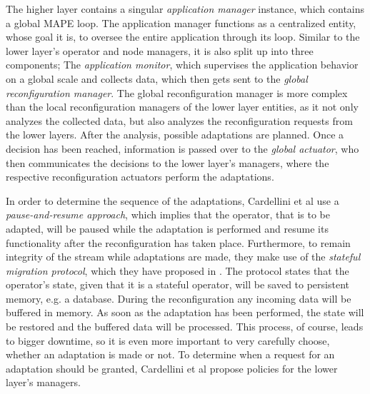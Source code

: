         \quad The higher layer contains a singular \textit{application manager} instance, which contains a global MAPE loop.
        The application manager functions as a centralized entity, whose goal it is, to oversee the entire application through its loop.
        Similar to the lower layer's operator and node managers, it is also split up into three components;
        The \textit{application monitor}, which supervises the application behavior on a global scale and collects data, which then gets sent to the \textit{global reconfiguration manager}.
        The global reconfiguration manager is more complex than the local reconfiguration managers of the lower layer entities, as it not only analyzes the collected data, but 
        also analyzes the reconfiguration requests from the lower layers. After the analysis, possible adaptations are planned.
        Once a decision has been reached, information is passed over to the \textit{global actuator}, who then communicates the decisions to the lower layer's managers, 
        where the respective reconfiguration actuators perform the adaptations.
        
        \quad In order to determine the sequence of the adaptations, Cardellini et al use a \textit{pause-and-resume approach}\cite{Heinze2014CloudbasedDS}, 
        which implies that the operator, that is to be adapted, will be paused while the adaptation is performed and resume its functionality after the 
        reconfiguration has taken place. 
        Furthermore, to remain integrity of the stream while adaptations are made, they make use of the \textit{stateful migration protocol}, 
        which they have proposed in \cite{migrationProtocol}. The protocol states that the operator's state, given that it is a stateful operator, 
        will be saved to persistent memory, e.g. a database. During the reconfiguration any incoming data will be buffered in memory.
        As soon as the adaptation has been performed, the state will be restored and the buffered data will be processed.
        This process, of course, leads to bigger downtime, so it is even more important to very carefully choose, whether an adaptation is made or not.
        To determine when a request for an adaptation should be granted, Cardellini et al propose policies for the lower layer's managers.

